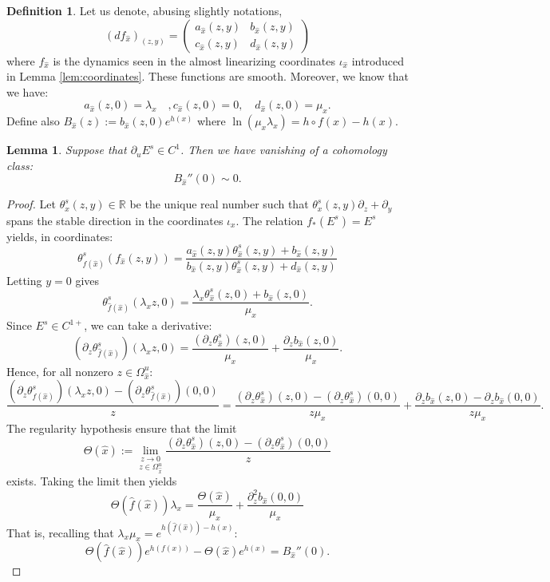 \documentclass[a4paper]{article}
\newtheorem{lemma}[theorem]{Lemma}
\theoremstyle{definition}
\newtheorem{definition}{Definition}[section]
\begin{document}
\begin{definition}
Let us denote, abusing slightly notations, $$(df_{\widehat{x}})_{(z,y)} =   \left( \begin{array}{lrcl}
  a_{\widehat{x}}(z,y) & b_{\widehat{x}}(z,y) \\
     c_{\widehat{x}}(z,y) & d_{\widehat{x}}(z,y)   \end{array} \right) $$
where $f_{\widehat{x}}$ is the dynamics seen in the almost linearizing coordinates $\iota_{\widehat{x}}$ introduced in Lemma \ref{lem:coordinates}. These functions are smooth. Moreover, we know that we have:
$$ a_{\widehat{x}}(z,0) = \lambda_x \quad , c_{\widehat{x}}(z,0)=0, \quad d_{\widehat{x}}(z,0)= \mu_x. $$
Define also $B_{\widehat{x}}(z) := b_{\widehat{x}}(z,0) e^{h(x)}$
where $\ln(\mu_x \lambda_x) = h\circ f(x) - h(x)$.
\end{definition}

\begin{lemma}
Suppose that $\partial_u E^s \in C^1$. Then we have vanishing of a cohomology class: 
$$ B_{\widehat{x}}''(0) \sim 0. $$
\end{lemma}

\begin{proof}
Let $\theta_x^s(z,y) \in \mathbb{R}$ be the unique real number such that $ \theta_x^s(z,y) \partial_z + \partial_y$ spans the stable direction in the coordinates $\iota_x$. The relation $f_*(E^s) = E^s$ yields, in coordinates:
$$ \theta_{\widehat{f}({\widehat{x}})}^s(f_{\widehat{x}}(z,y)) = \frac{a_{\widehat{x}}(z,y) \theta_{\widehat{x}}^s(z,y) + b_{\widehat{x}}(z,y)}{b_{\widehat{x}}(z,y) \theta_{\widehat{x}}^s(z,y) + d_{\widehat{x}}(z,y)} $$
Letting $y=0$ gives
$$ \theta_{\widehat{f}({\widehat{x}})}^s(\lambda_x z,0) = \frac{\lambda_x \theta_{\widehat{x}}^s(z,0) + b_{\widehat{x}}(z,0)}{\mu_x} .$$
Since $E^s \in C^{1+}$, we can take a derivative:
$$ (\partial_z\theta_{\widehat{f}({\widehat{x}})}^s)(\lambda_x z,0) = \frac{ (\partial_z \theta_{\widehat{x}}^s)(z,0)}{\mu_x} + \frac{\partial_z b_{\widehat{x}}(z,0)}{\mu_x}.  $$
Hence, for all nonzero $z \in \Omega_{\widehat{x}}^u$:
$$ \frac{(\partial_z \theta_{\widehat{f}({\widehat{x}})}^s)(\lambda_x z,0) - (\partial_z \theta_{\widehat{f}({\widehat{x}})}^s)( 0,0)}{z}  = \frac{ (\partial_z \theta_{\widehat{x}}^s)(z,0) - (\partial_z \theta_{\widehat{x}}^s)(0,0)}{z \mu_x} + \frac{\partial_z b_{\widehat{x}}(z,0) - \partial_z b_{\widehat{x}}(0,0)}{z \mu_x}. $$
The regularity hypothesis ensure that the limit $$ \Theta({\widehat{x}}) := \underset{z \in \Omega_{\widehat{x}}^u}{\underset{ z \rightarrow 0}{\lim}} \frac{(\partial_z \theta_{\widehat{x}}^s)(z,0) - (\partial_z \theta_{\widehat{x}}^s)(0,0)}{z} $$
exists. Taking the limit then yields
$$ \Theta(\widehat{f}({\widehat{x}})) \lambda_x = \frac{\Theta({\widehat{x}})}{\mu_x} + \frac{\partial_z^2 b_{\widehat{x}}(0,0)}{\mu_x} $$
That is, recalling that $\lambda_x \mu_x = e^{h(\widehat{f}({\widehat{x}}))-h(x)}$:
$$ \Theta(\widehat{f}({\widehat{x}})) e^{h(f(x))} - \Theta({\widehat{x}}) e^{h(x)} = B_{\widehat{x}}''(0). $$
\end{proof}
\end{document}
